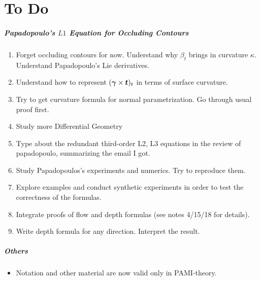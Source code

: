 \mynewpage
\chapter{To Do}
\paragraph{Papadopoulo's $L1$ Equation for Occluding Contours}
\begin{enumerate}
\item Forget occluding contours for now. Understand why $\beta_t$ brings in curvature $\kappa$. Understand
Papadopoulo's Lie derivatives.
\item Understand how to represent $(\boldsymbol{\gamma}\times\boldsymbol{t})_t$ in terms of surface
curvature.
\item Try to get curvature formula for normal parametrization. Go through usual
proof first.
\item Study more Differential Geometry
\item Type about the redundant third-order L2, L3 equations in the review of
papadopoulo, summarizing the email I got.
\item Study Papadopoulos's experiments and numerics. Try to reproduce them.
\item Explore examples and conduct synthetic experiments in order to test the correctness of the
formulas.
\item Integrate proofs of flow and depth formulas (see notes 4/15/18 for
details).
\item Write depth formula for any direction. Interpret the result.
\end{enumerate}

\paragraph{Others}
\begin{itemize}
\item Notation and other material are now valid only in PAMI-theory.
\end{itemize}


